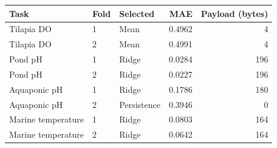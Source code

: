 \begin{tabular}{lllrr}
\toprule
Task & Fold & Selected & MAE & Payload (bytes) \\
\midrule
Tilapia DO & 1 & Mean & 0.4962 & 4 \\
Tilapia DO & 2 & Mean & 0.4991 & 4 \\
Pond pH & 1 & Ridge & 0.0284 & 196 \\
Pond pH & 2 & Ridge & 0.0227 & 196 \\
Aquaponic pH & 1 & Ridge & 0.1786 & 180 \\
Aquaponic pH & 2 & Persistence & 0.3946 & 0 \\
Marine temperature & 1 & Ridge & 0.0803 & 164 \\
Marine temperature & 2 & Ridge & 0.0642 & 164 \\
\bottomrule
\end{tabular}